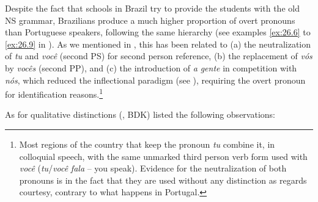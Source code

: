\documentclass[output=paper]{langsci/langscibook}
\begin{document}
Despite the fact that schools in Brazil try to
provide the students with the old NS grammar, Brazilians produce a much higher
proportion of overt pronouns than Portuguese speakers, following the same
hierarchy (see examples \eqref{ex:26.6} to \eqref{ex:26.9} in
). As we mentioned in , this has
been related to (a) the neutralization of \emph{tu} and \emph{você} (second PS)
for second person reference, (b) the replacement of \emph{vós} by \emph{vocês}
(second PP), and (c) the introduction of \emph{a} \emph{gente}  in competition
with \emph{nós}, which reduced the inflectional paradigm (see
), requiring the overt pronoun for identification
reasons.\footnote{Most regions of the country that keep the pronoun \emph{tu}
    combine it, in colloquial speech, with the same unmarked third person verb
    form used with \emph{você} (\emph{tu}/\emph{você} \emph{fala} – you speak).
    Evidence for the neutralization of both pronouns is in the fact that they
    are used without any distinction as regards courtesy, contrary to what
happens in Portugal.}

As for qualitative distinctions \citeauthor{BarbosaDuarteKato2005}
(\citeyear[19]{BarbosaDuarteKato2005}, BDK) listed the following observations:
\end{document}
